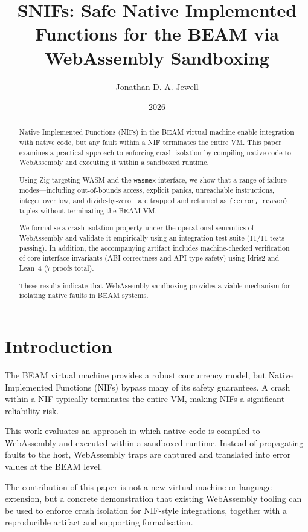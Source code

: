 \documentclass{article}
\title{SNIFs: Safe Native Implemented Functions for the BEAM via WebAssembly Sandboxing}
\author{Jonathan D. A. Jewell}
\date{2026}
\begin{document}
\maketitle

\begin{abstract}
Native Implemented Functions (NIFs) in the BEAM virtual machine enable integration with native code, but any fault within a NIF terminates the entire VM. This paper examines a practical approach to enforcing crash isolation by compiling native code to WebAssembly and executing it within a sandboxed runtime.

Using Zig targeting WASM and the \texttt{wasmex} interface, we show that a range of failure modes—including out-of-bounds access, explicit panics, unreachable instructions, integer overflow, and divide-by-zero—are trapped and returned as \texttt{\{:error, reason\}} tuples without terminating the BEAM VM.

We formalise a crash-isolation property under the operational semantics of WebAssembly and validate it empirically using an integration test suite (11/11 tests passing). In addition, the accompanying artifact includes machine-checked verification of core interface invariants (ABI correctness and API type safety) using Idris2 and Lean~4 (7 proofs total).

These results indicate that WebAssembly sandboxing provides a viable mechanism for isolating native faults in BEAM systems.
\end{abstract}

\section{Introduction}

The BEAM virtual machine provides a robust concurrency model, but Native Implemented Functions (NIFs) bypass many of its safety guarantees. A crash within a NIF typically terminates the entire VM, making NIFs a significant reliability risk.

This work evaluates an approach in which native code is compiled to WebAssembly and executed within a sandboxed runtime. Instead of propagating faults to the host, WebAssembly traps are captured and translated into error values at the BEAM level.

The contribution of this paper is not a new virtual machine or language extension, but a concrete demonstration that existing WebAssembly tooling can be used to enforce crash isolation for NIF-style integrations, together with a reproducible artifact and supporting formalisation.
\end{document}
